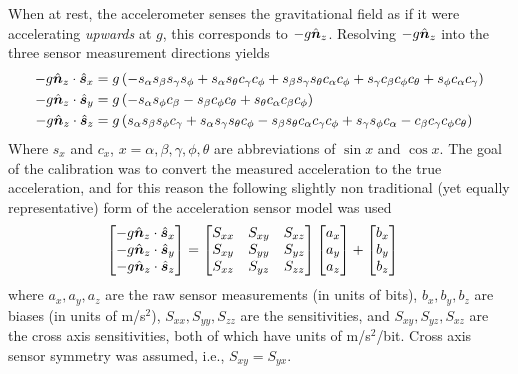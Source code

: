 When at rest, the accelerometer senses the gravitational field as if it were
accelerating \textit{upwards} at $g$, this corresponds to $-g\hat{\boldsymbol{n}}_{z}$.
Resolving $-g\hat{\boldsymbol{n}}_{z}$ into the three sensor measurement directions yields
\begin{align}
  \label{rb:eq:imux}
  -g\uv{n}{z} \cdot \uv{s}{x} &= g \left(- s_{\alpha}
s_{\beta} s_{\gamma}
s_{\phi} + s_{\alpha}
s_{\theta} c_{\gamma}
c_{\phi} + s_{\beta}
s_{\gamma} s_{\theta}
c_{\alpha} c_{\phi} +
s_{\gamma} c_{\beta}
c_{\phi} c_{\theta} +
s_{\phi} c_{\alpha}
c_{\gamma}\right) \\
%
  \label{rb:eq:imuy}
  -g\uv{n}{z} \cdot \uv{s}{y} &= g \left(- s_{\alpha}
s_{\phi} c_{\beta} -
s_{\beta} c_{\phi}
c_{\theta} + s_{\theta}
c_{\alpha} c_{\beta}
c_{\phi}\right) \\
%
  \label{rb:eq:imuz}
  -g\uv{n}{z} \cdot \uv{s}{z} &= g \left(s_{\alpha}
s_{\beta} s_{\phi}
c_{\gamma} + s_{\alpha}
s_{\gamma} s_{\theta}
c_{\phi} - s_{\beta}
s_{\theta} c_{\alpha}
c_{\gamma} c_{\phi} +
s_{\gamma} s_{\phi}
c_{\alpha} - c_{\beta}
c_{\gamma} c_{\phi}
c_{\theta}\right)
\end{align}
Where $s_{x}$ and $c_{x}$, $x=\alpha,\beta,\gamma,\phi,\theta$ are
abbreviations of $\sin{x}$ and $\cos{x}$. The goal of the calibration was to
convert the measured acceleration to the true acceleration, and for this reason
the following slightly non traditional (yet equally representative) form of the
acceleration sensor model was used
\begin{align}
  \label{rb:eq:sensormodel}
  \left[
    \begin{matrix}
      -g\hat{\boldsymbol{n}}_{z} \cdot \hat{\boldsymbol{s}}_{x} \\
      -g\hat{\boldsymbol{n}}_{z} \cdot \hat{\boldsymbol{s}}_{y} \\
      -g\hat{\boldsymbol{n}}_{z} \cdot \hat{\boldsymbol{s}}_{z}
    \end{matrix}
  \right]
  &=
  \left[
    \begin{matrix}
      S_{xx} & S_{xy} & S_{xz}\\
      S_{xy} & S_{yy} & S_{yz}\\
      S_{xz} & S_{yz} & S_{zz}
    \end{matrix}
  \right]
  \left[
    \begin{matrix}
      a_{x} \\
      a_{y} \\
      a_{z}
    \end{matrix}
  \right]
  +
  \left[
    \begin{matrix}
      b_{x} \\
      b_{y} \\
      b_{z}
    \end{matrix}
  \right]
\end{align}
where $a_x, a_y, a_z$ are the raw sensor measurements (in units of bits), $b_x,
b_y, b_z$ are biases (in units of m/s$^2$), $S_{xx}, S_{yy}, S_{zz}$ are the
sensitivities, and $S_{xy}, S_{yz}, S_{xz}$ are the cross axis sensitivities,
both of which have units of m/s$^2$/bit. Cross axis sensor symmetry was
assumed, i.e., $S_{xy} = S_{yx}$.

